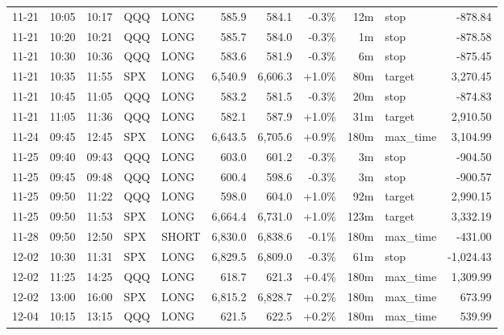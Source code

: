 \documentclass[11pt,a4paper,twoside]{article}
\begin{document}
\begin{center}
\begin{longtable}{>{\color{txtmain}}l l l l l r r r r >{\color{txtmain}}l r}
11-21 & 10:05 & 10:17 & QQQ & LONG & 585.9 & 584.1 & \textcolor{lossred}{-0.3\%} & 12m & stop & \textcolor{lossred}{-878.84} \\
11-21 & 10:20 & 10:21 & QQQ & LONG & 585.7 & 584.0 & \textcolor{lossred}{-0.3\%} & 1m & stop & \textcolor{lossred}{-878.58} \\
11-21 & 10:30 & 10:36 & QQQ & LONG & 583.6 & 581.9 & \textcolor{lossred}{-0.3\%} & 6m & stop & \textcolor{lossred}{-875.45} \\
11-21 & 10:35 & 11:55 & SPX & LONG & 6,540.9 & 6,606.3 & \textcolor{wingreen}{+1.0\%} & 80m & target & \textcolor{wingreen}{3,270.45} \\
11-21 & 10:45 & 11:05 & QQQ & LONG & 583.2 & 581.5 & \textcolor{lossred}{-0.3\%} & 20m & stop & \textcolor{lossred}{-874.83} \\
11-21 & 11:05 & 11:36 & QQQ & LONG & 582.1 & 587.9 & \textcolor{wingreen}{+1.0\%} & 31m & target & \textcolor{wingreen}{2,910.50} \\
11-24 & 09:45 & 12:45 & SPX & LONG & 6,643.5 & 6,705.6 & \textcolor{wingreen}{+0.9\%} & 180m & max\_time & \textcolor{wingreen}{3,104.99} \\
11-25 & 09:40 & 09:43 & QQQ & LONG & 603.0 & 601.2 & \textcolor{lossred}{-0.3\%} & 3m & stop & \textcolor{lossred}{-904.50} \\
11-25 & 09:45 & 09:48 & QQQ & LONG & 600.4 & 598.6 & \textcolor{lossred}{-0.3\%} & 3m & stop & \textcolor{lossred}{-900.57} \\
11-25 & 09:50 & 11:22 & QQQ & LONG & 598.0 & 604.0 & \textcolor{wingreen}{+1.0\%} & 92m & target & \textcolor{wingreen}{2,990.15} \\
11-25 & 09:50 & 11:53 & SPX & LONG & 6,664.4 & 6,731.0 & \textcolor{wingreen}{+1.0\%} & 123m & target & \textcolor{wingreen}{3,332.19} \\
11-28 & 09:50 & 12:50 & SPX & SHORT & 6,830.0 & 6,838.6 & \textcolor{lossred}{-0.1\%} & 180m & max\_time & \textcolor{lossred}{-431.00} \\
12-02 & 10:30 & 11:31 & SPX & LONG & 6,829.5 & 6,809.0 & \textcolor{lossred}{-0.3\%} & 61m & stop & \textcolor{lossred}{-1,024.43} \\
12-02 & 11:25 & 14:25 & QQQ & LONG & 618.7 & 621.3 & \textcolor{wingreen}{+0.4\%} & 180m & max\_time & \textcolor{wingreen}{1,309.99} \\
12-02 & 13:00 & 16:00 & SPX & LONG & 6,815.2 & 6,828.7 & \textcolor{wingreen}{+0.2\%} & 180m & max\_time & \textcolor{wingreen}{673.99} \\
12-04 & 10:15 & 13:15 & QQQ & LONG & 621.5 & 622.5 & \textcolor{wingreen}{+0.2\%} & 180m & max\_time & \textcolor{wingreen}{539.99} \\

\end{longtable}
\end{center}
\end{document}
